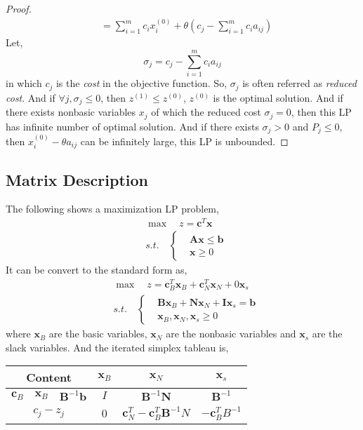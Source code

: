 \documentclass{article}
\begin{document}
\begin{proof}
\begin{align}
		& = \sum_{i=1}^{m} c_ix_i^{(0)} + \theta (c_j - \sum_{i=1}^{m}c_i a_{ij})
	\end{align}
	Let,
	\begin{equation}
		\sigma_j = c_j - \sum_{i=1}^{m} c_i a_{ij}
	\end{equation}
	in which $c_j$ is the \textit{cost} in the objective function. So, $\sigma_j$ is often referred as \textit{reduced cost}. And if $\forall j, \sigma_j \leq 0$, then $z^{(1)} \leq z^{(0)}$, $z^{(0)}$ is the optimal solution. And if there exists nonbasic variables $x_j$ of which the reduced cost $\sigma_j = 0$, then this LP has infinite number of optimal solution. And if there exists $\sigma_j > 0$ and $P_j \leq 0$, then $x_i^{(0)} - \theta a_{ij}$ can be infinitely large, this LP is unbounded.
\end{proof}


\subsection{Matrix Description}

The following shows a maximization LP problem,
\begin{align}
& \max \quad z = \bm{c}^T\bm{x} \label{LP-obj} \\
& s.t. \quad \left\{ 
\begin{aligned}
& \bm{A}\bm{x} \leq \bm{b} \\
& \bm{x} \geq 0
\end{aligned} \right. \label{LP-cons}
\end{align}
It can be convert to the standard form as,
\begin{align}
	& \max \quad z = \bm{c}_B^T\bm{x}_B + \bm{c}_N^T \bm{x}_N + 0 \bm{x}_s \\
	& s.t. \quad \left\{ 
	\begin{aligned}
		& \bm{B}\bm{x}_B + \bm{N} \bm{x}_N + \bm{I}\bm{x}_s = \bm{b} \\
		& \bm{x}_B, \bm{x}_N, \bm{x}_s \geq 0
	\end{aligned} \right.
\end{align}
where $\bm{x}_B$ are the basic variables, $\bm{x}_N$ are the nonbasic variables and $\bm{x}_s$ are the slack variables. And the iterated simplex tableau is,

\begin{table}[htbp]
	\centering
	\begin{tabular}{@{}cccccc@{}}
		\toprule
		\multicolumn{3}{c}{Content} & $\bm{x}_B$ & $\bm{x}_N$      & $\bm{x}_s$  \\ \midrule
		$\bm{c}_B$      & $\bm{x}_B$      & $\bm{B}^{-1}\bm{b}$      & $I$  & $\bm{B}^{-1}\bm{N}$      & $\bm{B}^{-1}$   \\ \midrule
		\multicolumn{3}{c}{$c_j-z_j$}     & 0  & $\bm{c}^T_N-\bm{c}^T_B\bm{B}^{-1}N$ & $-\bm{c}^T_BB^{-1}$ \\ \bottomrule
	\end{tabular}%
\end{table}
\end{document}
